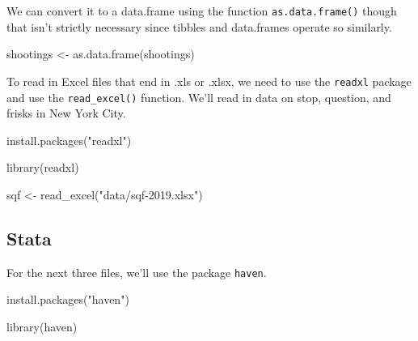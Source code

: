 \documentclass[
]{krantz}
\makeatletter
\newenvironment{Shaded}{\begin{snugshade}}{\end{snugshade}}
\newcommand{\FunctionTok}[1]{\textcolor[rgb]{0,0,0}{#1}}
\newcommand{\NormalTok}[1]{#1}
\newcommand{\OtherTok}[1]{\textcolor[rgb]{0.37,0.37,0.37}{#1}}
\newcommand{\StringTok}[1]{\textcolor[rgb]{0.5,0.5,0.5}{#1}}
\newenvironment{kframe}{%
\medskip{}
\setlength{\fboxsep}{.8em}
 \def\at@end@of@kframe{}%
 \ifinner\ifhmode%
  \def\at@end@of@kframe{\end{minipage}}%
  \begin{minipage}{\columnwidth}%
 \fi\fi%
 \def\FrameCommand##1{\hskip\@totalleftmargin \hskip-\fboxsep
 \colorbox{shadecolor}{##1}\hskip-\fboxsep
     \hskip-\linewidth \hskip-\@totalleftmargin \hskip\columnwidth}%
 \MakeFramed {\advance\hsize-\width
   \@totalleftmargin\z@ \linewidth\hsize
   \@setminipage}}%
 {\par\unskip\endMakeFramed%
 \at@end@of@kframe}
\renewenvironment{Shaded}{\begin{kframe}}{\end{kframe}}
\makeatother
\begin{document}
We can convert it to a data.frame using the function
\texttt{as.data.frame()} though that isn't strictly
necessary since tibbles and data.frames operate so
similarly.

\begin{Shaded}
\begin{Highlighting}[]
\NormalTok{shootings }\OtherTok{\textless{}{-}} \FunctionTok{as.data.frame}\NormalTok{(shootings)}
\end{Highlighting}
\end{Shaded}

To read in Excel files that end in .xls or .xlsx, we need to
use the \texttt{readxl} package and use the
\texttt{read\_excel()} function. We'll read in data on stop,
question, and frisks in New York City.

\begin{Shaded}
\begin{Highlighting}[]
\FunctionTok{install.packages}\NormalTok{(}\StringTok{"readxl"}\NormalTok{)}
\end{Highlighting}
\end{Shaded}

\begin{Shaded}
\begin{Highlighting}[]
\FunctionTok{library}\NormalTok{(readxl)}
\end{Highlighting}
\end{Shaded}

\begin{Shaded}
\begin{Highlighting}[]
\NormalTok{sqf }\OtherTok{\textless{}{-}} \FunctionTok{read\_excel}\NormalTok{(}\StringTok{"data/sqf{-}2019.xlsx"}\NormalTok{)}
\end{Highlighting}
\end{Shaded}

\hypertarget{stata}{%
\subsection{Stata}\label{stata}}

For the next three files, we'll use the package
\texttt{haven}.

\begin{Shaded}
\begin{Highlighting}[]
\FunctionTok{install.packages}\NormalTok{(}\StringTok{"haven"}\NormalTok{)}
\end{Highlighting}
\end{Shaded}

\begin{Shaded}
\begin{Highlighting}[]
\FunctionTok{library}\NormalTok{(haven)}
\end{Highlighting}
\end{Shaded}
\end{document}
